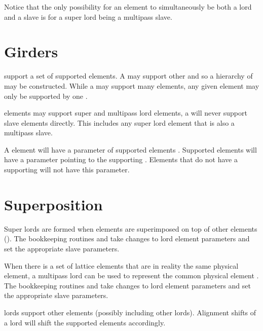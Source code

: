 Notice that the only possibility for an element to simultaneously be both a lord and a slave is
for a super lord being a multipass slave.

\section{Girders}

 support a set of supported elements. A  may support other 
and so a hierarchy of  may be constructed. While a  may support many elements,
any given element may only be supported by one .

 elements may support super and multipass lord elements, a  will never support
slave elements directly. This includes any super lord element that is also a multipass slave.

A  element will have a  parameter of supported elements . 
Supported elements will have a  parameter pointing to the supporting .
Elements that do not have a supporting  will not have this parameter.

\section{Superposition}
\label{s:super.book}

Super lords are formed when elements are superimposed on top of other elements ().
The \accellat bookkeeping routines and take changes to lord element parameters and set the 
appropriate slave parameters.

When there is a set of lattice elements that are in reality the same physical element, a
multipass lord can be used to represent the common physical element . 
The \accellat bookkeeping routines and take changes to lord element parameters and set the 
appropriate slave parameters.

 lords support other elements (possibly including other  lords). Alignment
shifts of a  lord will shift the supported elements accordingly.

